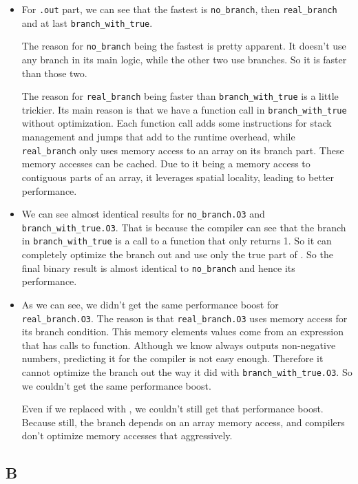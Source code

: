 \documentclass[12pt]{article}
\begin{document}
\begin{itemize}
\item
For \Verb+.out+ part, we can see that the fastest is \Verb+no_branch+, then \Verb+real_branch+ and at last \Verb+branch_with_true+.

The reason for \Verb+no_branch+ being the fastest is pretty apparent. It doesn't use any branch in its main logic, while the other two use branches. So it is faster than those two.

The reason for \Verb+real_branch+ being faster than \Verb+branch_with_true+ is a little trickier. Its main reason is that we have a function call in \Verb+branch_with_true+ without optimization. Each function call adds some instructions for stack management and jumps that add to the runtime overhead, while \Verb+real_branch+ only uses memory access to an array on its branch part. These memory accesses can be cached. Due to it being a memory access to contiguous parts of an array, it leverages spatial locality, leading to better performance.


\item 
We can see almost identical results for
\Verb+no_branch.O3+ and \Verb+branch_with_true.O3+. That is because the compiler can see that the branch in \Verb+branch_with_true+ is a call to a function that only returns 1. So it can completely optimize the branch out and use only the true part of . So the final binary result is almost identical to \Verb+no_branch+ and hence its performance.

\item 
As we can see, we didn't get the same performance boost for \Verb+real_branch.O3+. The reason is that \Verb+real_branch.O3+ uses memory access for its branch condition. This memory elements values come from an expression that has calls to  function. Although we know  always outputs non-negative numbers, predicting it for the compiler is not easy enough. Therefore it cannot optimize the branch out the way it did with \Verb+branch_with_true.O3+. So we couldn't get the same performance boost.

Even if we replaced  with , we couldn't still get that performance boost. Because still, the branch depends on an array memory access, and compilers don't optimize memory accesses that aggressively.



	\end{itemize}
	
	
	
	\subsection{B}
	
\end{document}
